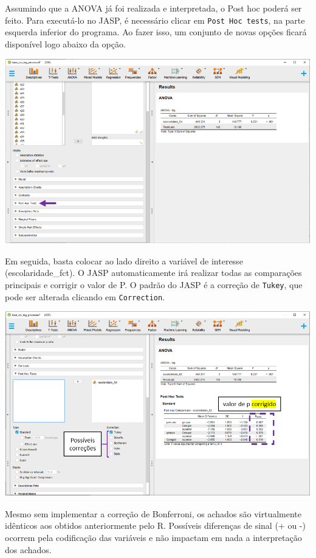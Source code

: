 \documentclass[
]{book}
\begin{document}
Assumindo que a ANOVA já foi realizada e interpretada, o Post hoc poderá ser feito. Para executá-lo no JASP, é necessário clicar em \texttt{Post\ Hoc\ tests}, na parte esquerda inferior do programa. Ao fazer isso, um conjunto de novas opções ficará disponível logo abaixo da opção.

\includegraphics{./img/cap_anova_posthoc_interface.png}

Em seguida, basta colocar ao lado direito a variável de interesse (escolaridade\_fct). O JASP automaticamente irá realizar todas as comparações principais e corrigir o valor de P. O padrão do JASP é a correção de \texttt{Tukey}, que pode ser alterada clicando em \texttt{Correction}.

\includegraphics{./img/cap_anova_posthoc_resultados.png}

Mesmo sem implementar a correção de Bonferroni, os achados são virtualmente idênticos aos obtidos anteriormente pelo R. Possíveis diferenças de sinal (+ ou -) ocorrem pela codificação das variáveis e não impactam em nada a interpretação dos achados.
\end{document}
